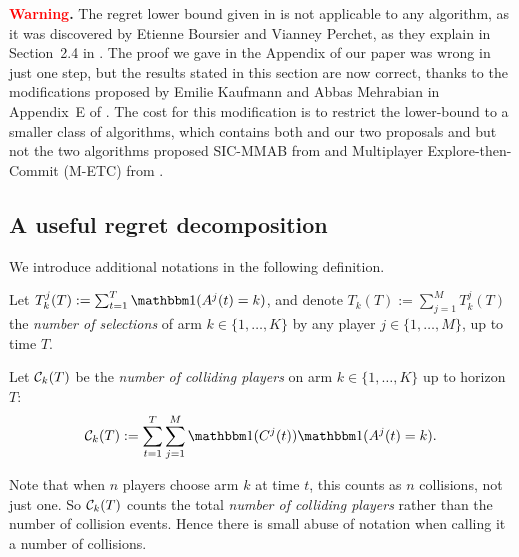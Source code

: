   \textbf{\textcolor{red}{Warning}.}
  The regret lower bound given in \cite{Besson2018ALT} is not applicable to any algorithm,
  as it was discovered by Etienne Boursier and Vianney Perchet, as they explain in Section~2.4 in \cite{BoursierPerchet18}.
  The proof we gave in the Appendix of our paper \cite{Besson2018ALT} was wrong in just one step,
  but the results stated in this section are now correct,
  thanks to the modifications proposed by Emilie Kaufmann and Abbas Mehrabian in Appendix~E of \cite{KaufmannAbbas19}.
  The cost for this modification is to restrict the lower-bound to a smaller class of algorithms, which contains both \RhoRand{} and our two proposals \RandTopM{} and \MCTopM{} but not the two algorithms proposed SIC-MMAB from \cite{BoursierPerchet18} and Multiplayer Explore-then-Commit (M-ETC) from \cite{KaufmannAbbas19}.


\subsection{A useful regret decomposition}
\label{sub:5:defregret}

We introduce additional notations in the following definition.

\begin{definition}
  \label{def:5:nbSelections_nbCollisions}
  Let $T^j_k(T) := \sum_{t=1}^T \indic(A^j(t) = k)$,
  and denote $T_k(T) := \sum_{j=1}^M T^j_k(T)$ the \emph{number of selections} of arm $k\in\{1,\dots,K\}$ by any player $j\in\{1,\dots,M\}$, up to time $T$.

  Let $\mathcal{C}_k(T)$ be the \emph{number of colliding players} on arm $k\in\{1,\dots,K\}$ up to horizon $T$:
  \begin{equation}
    \cC_k(T) :=
    \sum_{t=1}^{T} \sum_{j=1}^{M} \indic(C^j(t)) \indic(A^j(t) = k).
  \end{equation}
\end{definition}

Note that when $n$ players choose arm $k$ at time $t$, this counts as $n$ collisions, not just one. So $\mathcal{C}_k(T)$ counts the total \emph{number of colliding players} rather than the number of collision events. Hence there is small abuse of notation when calling it a number of collisions.

